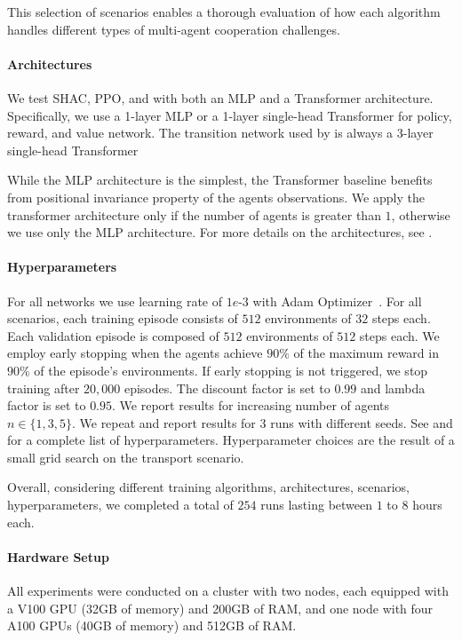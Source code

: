 \noindent This selection of scenarios enables a thorough evaluation of how each algorithm handles different types of multi-agent cooperation challenges.

\paragraph{Architectures}
We test SHAC, PPO, and \fname{} with both an MLP and a Transformer architecture. Specifically, we use a 1-layer MLP or a 1-layer single-head Transformer for policy, reward, and value network. The transition network used by \fname{} is always a 3-layer single-head Transformer

While the MLP architecture is the simplest, the Transformer baseline benefits from positional invariance property of the agents observations. We apply the transformer architecture only if the number of agents is greater than $1$, otherwise we use only the MLP architecture. For more details on the architectures, see .

\paragraph{Hyperparameters}
For all networks we use learning rate of $1e\text{-}3$ with Adam Optimizer~\cite{Kingma14}. For all scenarios, each training episode consists of $512$ environments of $32$ steps each. Each validation episode is composed of $512$ environments of $512$ steps each. We employ early stopping when the agents achieve $90\%$ of the maximum reward in $90\%$ of the episode's environments. If early stopping is not triggered, we stop training after $20,000$ episodes. The discount factor is set to $0.99$ and lambda factor is set to $0.95$. We report results for increasing number of agents $n\in\{1,3,5\}$. We repeat and report results for $3$ runs with different seeds. See  and  for a complete list of hyperparameters. Hyperparameter choices are the result of a small grid search on the transport scenario.

Overall, considering different training algorithms, architectures, scenarios, hyperparameters, we completed a total of $254$ runs lasting between $1$ to $8$ hours each. 

\paragraph{Hardware Setup}
All experiments were conducted on a cluster with two nodes, each equipped with a V100 GPU (32GB of memory) and 200GB of RAM, and one node with four A100 GPUs (40GB of memory) and 512GB of RAM. 

